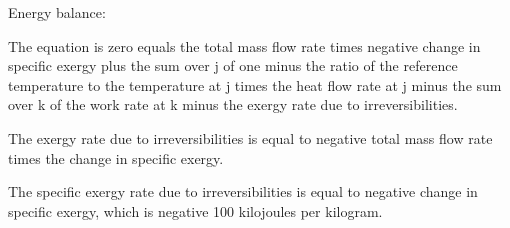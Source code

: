 Energy balance:

The equation is zero equals the total mass flow rate times negative change in specific exergy plus the sum over j of one minus the ratio of the reference temperature to the temperature at j times the heat flow rate at j minus the sum over k of the work rate at k minus the exergy rate due to irreversibilities.

The exergy rate due to irreversibilities is equal to negative total mass flow rate times the change in specific exergy.

The specific exergy rate due to irreversibilities is equal to negative change in specific exergy, which is negative 100 kilojoules per kilogram.